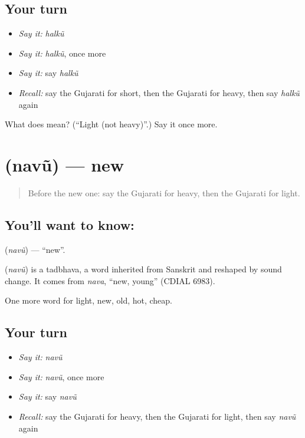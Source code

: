 \subsection*{Your turn}
\begin{itemize}
\raggedright
  \item \emph{Say it:} \emph{halkũ}
  \item \emph{Say it:} \emph{halkũ}, once more
  \item \emph{Say it:} say \emph{halkũ}
  \item \emph{Recall:} say the Gujarati for short, then the Gujarati for heavy, then say \emph{halkũ} again
\end{itemize}

\begin{tcolorbox}[breakable,colback=teal!4,colframe=teal!35!black,title={Before you move on}]
What does  mean? (\textquotedblleft{}Light (not heavy)\textquotedblright{}.) Say it once more.
\end{tcolorbox}
\section[\texorpdfstring{\gu{નવું} (navũ)}{નવું (navũ)}]{ (navũ) — new}

\label{lesson:GU-C73-new}



\begin{quote}
Before the new one: say the Gujarati for heavy, then the Gujarati for light.
\end{quote}

\subsection*{You'll want to know: }
\textbf{} (\emph{navũ}) — \textquotedblleft{}new\textquotedblright{}.

\begin{cousinweb}
\textbf{} (\emph{navũ}) is a tadbhava, a word inherited from Sanskrit and reshaped by sound change. It comes from \emph{nava}, \textquotedblleft{}new, young\textquotedblright{} (CDIAL 6983).
\end{cousinweb}

\begin{grammarlens}[title={What you've built}]
One more word for light, new, old, hot, cheap.
\end{grammarlens}

\subsection*{Your turn}
\begin{itemize}
\raggedright
  \item \emph{Say it:} \emph{navũ}
  \item \emph{Say it:} \emph{navũ}, once more
  \item \emph{Say it:} say \emph{navũ}
  \item \emph{Recall:} say the Gujarati for heavy, then the Gujarati for light, then say \emph{navũ} again
\end{itemize}

